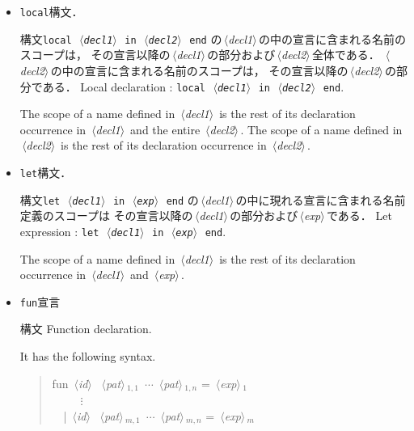 \documentclass{jbook}
\newcommand{\code}[1]{\mbox{\large\tt #1}}
\newcommand{\nonterm}[1]{\mbox{$\,\langle$}{\it #1}\mbox{$\rangle\,$}}
\newenvironment{program}{\begin{quote}\begin{tt}}%
                        {\end{tt}\end{quote}}
\begin{document}
\begin{itemize}
\item
\ifjp%
 \code{local}構文．

	構文\code{local \nonterm{decl1} in \nonterm{decl2} end}
の\nonterm{decl1}の中の宣言に含まれる名前のスコープは，
その宣言以降の\nonterm{decl1}の部分および\nonterm{decl2}全体である．
	\nonterm{decl2}の中の宣言に含まれる名前のスコープは，
その宣言以降の\nonterm{decl2}の部分である．
\else%
 Local declaration : \code{local \nonterm{decl1} in \nonterm{decl2} end}.

	The scope of a name defined in \nonterm{decl1} is the rest of
its declaration occurrence in \nonterm{decl1} and the entire \nonterm{decl2}.
	The scope of a name defined in \nonterm{decl2} is the rest of
its declaration occurrence in \nonterm{decl2}.
\fi%

\item
\ifjp%
 \code{let}構文．

	構文\code{let \nonterm{decl1} in \nonterm{exp} end}
の\nonterm{decl1}の中に現れる宣言に含まれる名前定義のスコープは
その宣言以降の\nonterm{decl1}の部分および\nonterm{exp}である．
\else%
 Let expression : \code{let \nonterm{decl1} in \nonterm{exp} end}.

	The scope of a name defined in \nonterm{decl1} is the rest of
its declaration occurrence in \nonterm{decl1} and \nonterm{exp}.
\fi%

\item
\ifjp%
 \code{fun}宣言

構文
\else%
 Function declaration.

	It has the following syntax.
\fi%
\begin{program}
fun \nonterm{id}\ \nonterm{pat}$_{1,1}$\ $\cdots$ \nonterm{pat}$_{1,n}$ = \nonterm{exp}$_1$\\
\ \ \ \ \ $\vdots$\\
\ \ | \nonterm{id}\ \nonterm{pat}$_{m,1}$\ $\cdots$ \nonterm{pat}$_{m,n}$ = \nonterm{exp}$_m$
\end{program}


\end{itemize}
\end{document}
